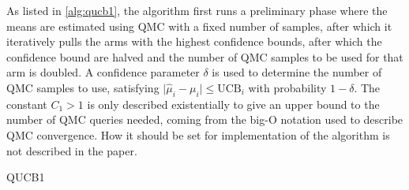 As listed in \cref{alg:qucb1}, the algorithm first runs a preliminary phase where the means are estimated using QMC with a fixed number of samples, after which it iteratively pulls the arms with the highest confidence bounds, after which the confidence bound are halved and the number of QMC samples to be used for that arm is doubled.
A confidence parameter $\delta$ is used to determine the number of QMC samples to use, satisfying $\lvert\hat{\mu}_i - \mu_i\rvert \leq \text{UCB}_i$ with probability $1-\delta$.
The constant $C_1>1$ is only described existentially to give an upper bound to the number of QMC queries needed, coming from the big-O notation used to describe QMC convergence.
How it should be set for implementation of the algorithm is not described in the paper.


\begin{algorithm}
    \SetAlgoLined
    \caption{QUCB1}
    \label{alg:qucb1}
\end{algorithm}


